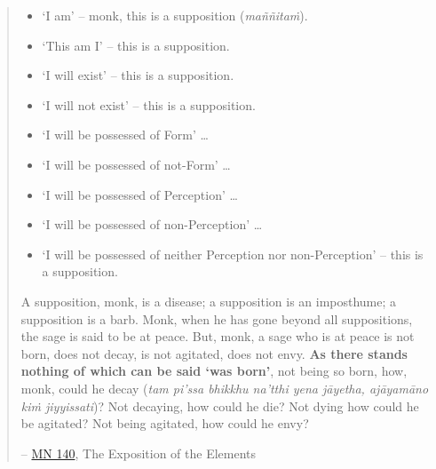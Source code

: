 \begin{quote}
\begin{itemize}
\item
  `I am' -- monk, this is a supposition (\emph{maññitaṁ}).
\item
  `This am I' -- this is a supposition.
\item
  `I will exist' -- this is a supposition.
\item
  `I will not exist' -- this is a supposition.
\item
  `I will be possessed of Form' \ldots\hspace{0pt}
\item
  `I will be possessed of not-Form' \ldots\hspace{0pt}
\item
  `I will be possessed of Perception' \ldots\hspace{0pt}
\item
  `I will be possessed of non-Perception' \ldots\hspace{0pt}
\item
  `I will be possessed of neither Perception nor non-Perception' -- this is a supposition.
\end{itemize}

A supposition, monk, is a disease; a supposition is an imposthume; a supposition is a barb. Monk, when he has gone beyond all suppositions, the sage is said to be at peace. But, monk, a sage who is at peace is not born, does not decay, is not agitated, does not envy. \textbf{As there stands nothing of which can be said `was born'}, not being so born, how, monk, could he decay (\emph{tam pi'ssa bhikkhu na'tthi yena jāyetha, ajāyamāno kiṁ jiyyissati})? Not decaying, how could he die? Not dying how could he be agitated? Not being agitated, how could he envy?

 -- \href{https://suttacentral.net/mn140/en/bodhi}{MN 140}, The Exposition of the Elements
\end{quote}

